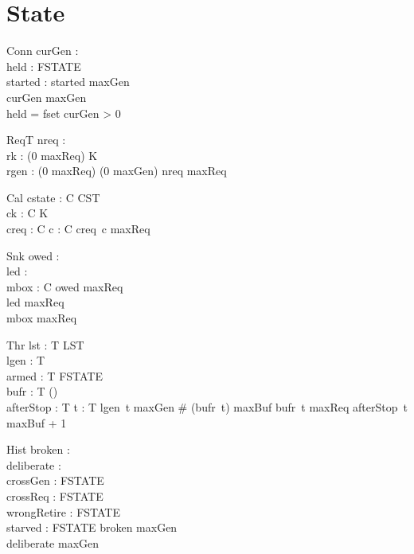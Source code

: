 \documentclass[a4paper,10pt,fleqn]{article}
\begin{document}
\section{State}

\begin{schema}{Conn}
  curGen : \nat \\
  held : FSTATE \\
  started : \power \nat
\where
  started  \upto maxGen \\
  curGen \leq maxGen \\
  held = fset \implies curGen > 0
\end{schema}

\begin{schema}{ReqT}
  nreq : \nat \\
  rk : (0 \upto maxReq) \fun K \\
  rgen : (0 \upto maxReq) \fun (0 \upto maxGen)
\where
  nreq \leq maxReq
\end{schema}

\begin{schema}{Cal}
  cstate : C \fun CST \\
  ck : C \fun K \\
  creq : C \fun \nat
\where
  \forall c : C \spot creq~c \leq maxReq
\end{schema}

\begin{schema}{Snk}
  owed : \power \nat \\
  led : \power \nat \\
  mbox : C \pfun \nat
\where
  owed  \upto maxReq \\
  led  \upto maxReq \\
  \ran mbox  \upto maxReq
\end{schema}

\begin{schema}{Thr}
  lst : T \fun LST \\
  lgen : T \fun \nat \\
  armed : T \fun FSTATE \\
  bufr : T \fun (\power \nat) \\
  afterStop : T \fun \nat
\where
  \forall t : T \spot lgen~t \leq maxGen \land \# (bufr~t) \leq maxBuf
    \land bufr~t  \upto maxReq \land afterStop~t \leq maxBuf + 1
\end{schema}

\begin{schema}{Hist}
  broken : \power \nat \\
  deliberate : \power \nat \\
  crossGen : FSTATE \\
  crossReq : FSTATE \\
  wrongRetire : FSTATE \\
  starved : FSTATE
\where
  broken  \upto maxGen \\
  deliberate  \upto maxGen
\end{schema}
\end{document}
